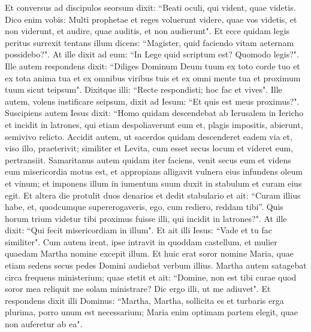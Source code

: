 \begin{biblechapter}
\verse Et conversus ad discipulos seorsum dixit: “Beati oculi, qui vident, quae videtis. 
\verse Dico enim vobis: Multi prophetae et reges voluerunt videre, quae vos videtis, et non viderunt, et audire, quae auditis, et non audierunt". 
\verse Et ecce quidam legis peritus surrexit tentans illum dicens: “Magister, quid faciendo vitam aeternam possidebo?". 
\verse At ille dixit ad eum: “In Lege quid scriptum est? Quomodo legis?". 
\verse Ille autem respondens dixit: “Diliges Dominum Deum tuum ex toto corde tuo et ex tota anima tua et ex omnibus viribus tuis et ex omni mente tua et proximum tuum sicut teipsum". 
\verse Dixitque illi: “Recte respondisti; hoc fac et vives". 
\verse Ille autem, volens iustificare seipsum, dixit ad Iesum: “Et quis est meus proximus?". 
\verse Suscipiens autem Iesus dixit: “Homo quidam descendebat ab Ierusalem in Iericho et incidit in latrones, qui etiam despoliaverunt eum et, plagis impositis, abierunt, semivivo relicto. 
\verse Accidit autem, ut sacerdos quidam descenderet eadem via et, viso illo, praeterivit; 
\verse similiter et Levita, cum esset secus locum et videret eum, pertransiit. 
\verse Samaritanus autem quidam iter faciens, venit secus eum et videns eum misericordia motus est,  
\verse et appropians alligavit vulnera eius infundens oleum et vinum; et imponens illum in iumentum suum duxit in stabulum et curam eius egit. 
\verse Et altera die protulit duos denarios et dedit stabulario et ait: “Curam illius habe, et, quodcumque supererogaveris, ego, cum rediero, reddam tibi”. 
\verse Quis horum trium videtur tibi proximus fuisse illi, qui incidit in latrones?". 
\verse At ille dixit: “Qui fecit misericordiam in illum". Et ait illi Iesus: “Vade et tu fac similiter". 
\verse Cum autem irent, ipse intravit in quoddam castellum, et mulier quaedam Martha nomine excepit illum. 
\verse Et huic erat soror nomine Maria, quae etiam sedens secus pedes Domini audiebat verbum illius. 
\verse Martha autem satagebat circa frequens ministerium; quae stetit et ait: “Domine, non est tibi curae quod soror mea reliquit me solam ministrare? Dic ergo illi, ut me adiuvet". 
\verse Et respondens dixit illi Dominus: “Martha, Martha, sollicita es et turbaris erga plurima, 
\verse porro unum est necessarium; Maria enim optimam partem elegit, quae non auferetur ab ea". 
\end{biblechapter}

